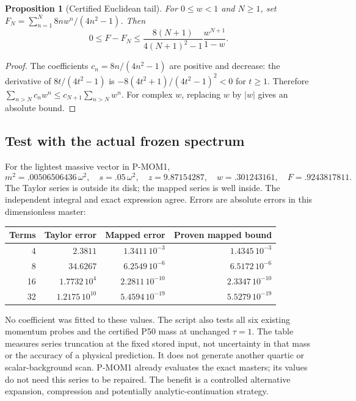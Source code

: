 \documentclass[11pt]{article}
\newtheorem{proposition}{Proposition}
\begin{document}
\begin{proposition}[Certified Euclidean tail]
For $0\le w<1$ and $N\ge1$, set $F_N=\sum_{n=1}^N8n w^n/(4n^2-1)$.
Then
\begin{equation}
 0\le F-F_N\le
 \frac{8(N+1)}{4(N+1)^2-1}\frac{w^{N+1}}{1-w}.
 \label{eq:tail}
\end{equation}
\end{proposition}
\begin{proof}
The coefficients $c_n=8n/(4n^2-1)$ are positive and decrease:
the derivative of $8t/(4t^2-1)$ is
$-8(4t^2+1)/(4t^2-1)^2<0$ for $t\ge1$.
Therefore $\sum_{n>N}c_nw^n\le c_{N+1}\sum_{n>N}w^n$.
For complex $w$, replacing $w$ by $|w|$ gives an absolute bound.
\end{proof}

\subsection{Test with the actual frozen spectrum}
For the lightest massive vector in P-MOM1,
\begin{equation}
 m^2=.00506506436\,\omega^2,\quad s=.05\,\omega^2,\quad
 z=9.87154287,\quad w=.301243161,\quad F=.9243817811.
\end{equation}
The Taylor series is outside its disk; the mapped series is well inside.
The independent integral and exact expression agree. Errors are
absolute errors in this dimensionless master:
\begin{center}
\begin{tabular}{rrrr}
\toprule
Terms & Taylor error & Mapped error & Proven mapped bound\\
\midrule
4 & $2.3811$ & $1.3411\,10^{-3}$ & $1.4345\,10^{-3}$\\
8 & $34.6267$ & $6.2549\,10^{-6}$ & $6.5172\,10^{-6}$\\
16 & $1.7732\,10^4$ & $2.2811\,10^{-10}$ & $2.3347\,10^{-10}$\\
32 & $1.2175\,10^{10}$ & $5.4594\,10^{-19}$ & $5.5279\,10^{-19}$\\
\bottomrule
\end{tabular}
\end{center}
No coefficient was fitted to these values. The script also tests all six
existing momentum probes and the certified P50 mass at unchanged $\tau=1$.
The table measures series truncation at the fixed stored input, not
uncertainty in that mass or the accuracy of a physical prediction.
It does not generate another quartic or scalar-background scan.
P-MOM1 already evaluates the exact masters; its values do not need this
series to be repaired. The benefit is a controlled alternative expansion,
compression and potentially analytic-continuation strategy.
\end{document}
